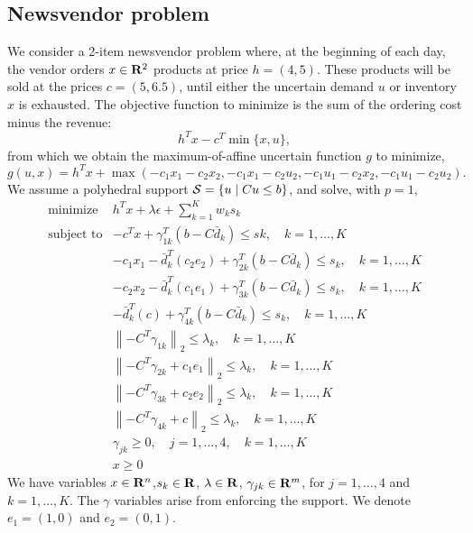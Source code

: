 \documentclass[12pt]{article}
\theoremstyle{thmstyleone}%
\theoremstyle{thmstyletwo}%
\theoremstyle{thmstylethree}%
\newcommand{\reviewChanges}{}
\begin{document}
\subsection{\reviewChanges{Newsvendor problem}}
\label{sub:news}
\reviewChanges{
We consider a 2-item newsvendor problem where, at the beginning of each day, the vendor orders $x\in {\mathbf R}^2$ products at price $h=(4,5)$. These products will be sold at the prices $c=(5,6.5)$, until either the uncertain demand $u$ or inventory $x$ is exhausted.
The objective function to minimize is the sum of the ordering cost minus the revenue:
\begin{equation*}
	h^Tx - c^T\min\{x,u\},
\end{equation*}
from which we obtain the maximum-of-affine uncertain function $g$ to minimize,
$$g(u,x) = h^Tx + \max(-c_1x_1 - c_2 x_2, -c_1 x_1 -c_2 u_2, -c_1u_1 -c_2x_2, -c_1u_1 - c_2u_2 ).$$}
\reviewChanges{
We assume a polyhedral support $\mathcal{S}= \{u \mid Cu\leq b\}$, and solve, with $p = 1$,
\begin{equation*}
	\label{eq:news}
	\begin{array}{ll}
	\text{minimize} & h^Tx  + \lambda\epsilon + \sum_{k=1}^K w_k s_{k} \\
	\text{subject to}  & -c^Tx + \gamma_{1k}^T(b - C\bar{d}_k)  \leq s{k}, \quad k = 1,\dots, K\\
	& -c_1 x_1 - \bar{d}_k^T(c_2e_2) + \gamma_{2k}^T(b - C\bar{d}_k) \leq s_k , \quad k = 1,\dots, K\\
& -c_2 x_2 - \bar{d}_k^T(c_1e_1) + \gamma_{3k}^T(b - C\bar{d}_k) \leq s_k, \quad k = 1,\dots, K\\
& -\bar{d}_k^T(c) + \gamma_{4k}^T(b - C\bar{d}_k) \leq s_k, \quad k = 1,\dots, K\\
	 & \left\| -C^T\gamma_{1k} \right\|_2 \leq \lambda_{k}, \quad k = 1,\dots, K\\
	 & \left\| -C^T\gamma_{2k}+ c_1 e_1 \right\|_2 \leq \lambda_{k}, \quad k = 1,\dots, K\\
	 & \left\| -C^T\gamma_{3k}+ c_2 e_2\right\|_2 \leq \lambda_{k}, \quad k = 1,\dots, K\\
	 & \left\| -C^T\gamma_{4k}+ c \right\|_2 \leq \lambda_{k}, \quad k = 1,\dots, K\\
	 & \gamma_{jk} \geq 0, \quad j = 1,\dots,4, \quad k = 1,\dots, K\\
	 & x \geq 0
	\end{array}
\end{equation*}
We have variables $x \in {\mathbf R}^{n}$,$s_{k} \in {\mathbf R}$, $\lambda \in {\mathbf R}$, $\gamma_{jk} \in {\mathbf R}^{m}$, for $j = 1,\dots,4$ and $k= 1,\dots,K$.
The $\gamma$ variables arise from enforcing the support. We denote $e_1 = (1,0)$ and $e_2 = (0,1)$.}
\end{document}
